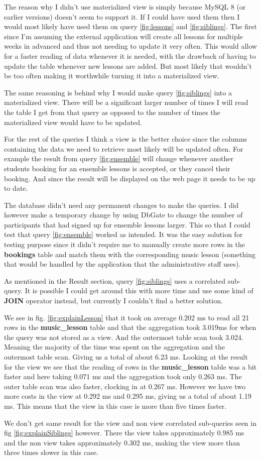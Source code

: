 \documentclass[a4paper]{scrreprt}
\begin{document}
The reason why I didn't use materialized view is simply because MySQL 8 (or earlier versions) doesn't seem to support it. If I could have used them then I would most 
likely have used them on query \ref{fig:lessons} and \ref{fig:siblings}. The first since I'm assuming the external application will create all lessons for multiple weeks
in advanced and thus not needing to update it very often. This would allow for a faster reading of data whenever it is needed, with the drawback of having to update the 
table whenever new lessons are added. But most likely that wouldn't be too often making it worthwhile turning it into a materialized view.

The same reasoning is behind why I would make query \ref{fig:siblings} into a materialized view. There will be a significant larger number of times I will read the table 
I get from that query as opposed to the number of times the materialized view would have to be updated. 

For the rest of the queries I think a view is the better choice since the columns containing the data we need to retrieve most likely will be updated often. For example 
the result from query \ref{fig:ensemble} will change whenever another students booking for an ensemble lessons is accepted, or they cancel their booking. And since the 
result will be displayed on the web page it needs to be up to date.

The database didn't need any permanent changes to make the queries. I did however make a temporary change by using DbGate to change the number of participants that had 
signed up for ensemble lessons larger. This so that I could test that query \ref{fig:ensemble} worked as intended. It was the easy solution for testing purpose since it
didn't require me to manually create more rows in the \textbf{bookings} table and match them with the corresponding music lesson (something that would be handled by 
the application that the administrative staff uses). 

As mentioned in the Result section, query \ref{fig:siblings} uses a correlated sub-query. It is possible I could get around this with more time and use some kind of 
\textbf{JOIN} operator instead, but currently I couldn't find a better solution. 

We see in fig. \ref{fig:explainLesson} that it took on average 0.202 ms to read all 21 rows in the \textbf{music\_lesson} table and that the aggregation took 3.019ms for
when the query was not stored as a view. And the outermost table scan took 3.024. Meaning the majority of the time was spent on the aggregation and the outermost table scan.
Giving us a total of about 6.23 ms. Looking at the result for the view we see that the reading of rows in the \textbf{music\_lesson} table was a bit faster and here 
taking 0.071 ms and the aggregation took only 0.263 ms. The outer table scan was also faster, clocking in at 0.267 ms. However we have two more costs in the view at 
0.292 ms and 0.295 ms, giving us a total of about 1.19 ms. This means that the view in this case is more than five times faster.

We don't get same result for the view and non view correlated sub-queries seen in fig \ref{fig:explainSiblings} however. There the view takes approximately 0.985 ms and
the non view takes approximately 0.302 ms, making the view more than three times slower in this case. 
\end{document}
